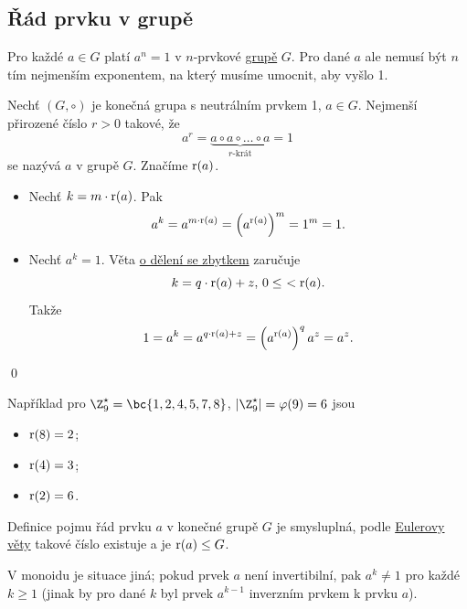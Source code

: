 \subsection{Řád prvku v grupě}\label{radPrvku}
Pro každé $a \in G$ platí $a^n = 1$ v $n$-prvkové \hyperref[grupa]{grupě} $G$. Pro dané $a$ ale nemusí být $n$ tím nejmenším exponentem, na který musíme umocnit, aby vyšlo 1.

Nechť $(G, \circ)$ je konečná grupa s neutrálním prvkem 1, $a \in G$. Nejmenší přirozené číslo $r > 0$ takové, že
\begin{equation}
	a^r = \underbrace{a \circ a \circ \dots \circ a}_{r\text{-krát}} = 1
\end{equation}
se nazývá  $a$ v grupě $G$. Značíme $\operatorname*{r}(a)$.\\
\dukaz
\vspace{-1em}
\begin{itemize}
	\item[$\Leftarrow$:] Nechť $k=m \cdot \operatorname*{r}(a)$. Pak
	\begin{equation}
		a^k = a^{m \cdot \operatorname*{r}(a)} = \left(a^{\operatorname*{r}(a)}\right)^m = 1^m = 1.
	\end{equation}
	\item[$\Rightarrow$:] Nechť $a^k = 1$. Věta \hyperref[delZbyt]{o dělení se zbytkem} zaručuje
	\begin{equation}
		k = q \cdot \operatorname*{r}(a) + z, \, 0 \leq \ < \operatorname*{r}(a).
	\end{equation}
	Takže
	\begin{equation}
		1= a^k = a^{q \cdot \operatorname*{r}(a) + z} = \left(a^{\operatorname*{r}(a)}\right)^q a^z = a^z.
	\end{equation}
\end{itemize}
\hspace{\fill}\qed

Například pro $\Z_9^\star = \bc{1,2,4,5,7,8}$, $|\Z_9^\star| = \varphi(9) = 6$ jsou
\vspace{-1em}
\begin{itemize}
	\item $\operatorname*{r}(8) = 2$;
	\item $\operatorname*{r}(4) = 3$;
	\item $\operatorname*{r}(2) = 6$.
\end{itemize}
Definice pojmu řád prvku $a$ v konečné grupě $G$ je smysluplná, podle \hyperref[euler]{Eulerovy věty} takové číslo existuje a je $\operatorname*{r}(a) \leq G$.

V monoidu je situace jiná; pokud prvek $a$ není invertibilní, pak $a^k \not= 1$ pro každé $k \geq 1$ (jinak by pro dané $k$ byl prvek $a^{k-1}$ inverzním prvkem k prvku $a$).

